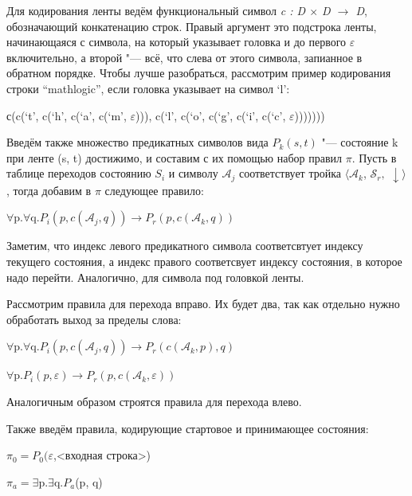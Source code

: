 Для кодирования ленты ведём функциональный символ \textit{c : D $\times$ D $\rightarrow$ D}, обозначающий
конкатенацию строк. Правый аргумент это подстрока ленты, начинающаяся с символа, на который указывает
головка и до первого $\varepsilon$ включительно, а второй "--- всё, что слева от этого символа, запианное
в обратном порядке. Чтобы лучше разобраться, рассмотрим пример кодирования строки ``mathlogic'', если
головка указывает на символ `l':

\begin{center}
        с(c(`t', c(`h', c(`a', c(`m', $\varepsilon$))), 
        c(`l', c(`o', c(`g', c(`i', c(`c', $\varepsilon$)))))))
\end{center}

Введём также множество предикатных символов вида $P_k(s, t)$ "--- состояние k при ленте (s, t) достижимо,
и составим с их помощью набор правил $\pi$. Пусть в таблице переходов состоянию $S_i$ и символу
$\mathcal{A}_j$ соответствует тройка $\langle\mathcal{A}_k$,  $\mathcal{S}_r,$ $\downarrow\rangle$, тогда
добавим в $\pi$ следующее правило:

\begin{center}
    $\forall$p.$\forall$q.$P_i(p, c(\mathcal{A}_j, q))\to P_r(p, c(\mathcal{A}_k, q))$
\end{center}

Заметим, что индекс левого предикатного символа соответсвтует индексу текущего состояния, а индекс
правого соответсвует индексу состояния, в которое надо перейти. Аналогично, для символа под головкой
ленты.

Рассмотрим правила для перехода вправо. Их будет два, так как отдельно нужно обработать
выход за пределы слова:
\begin{center}
    $\forall$p.$\forall$q.$P_i(p, c(\mathcal{A}_j, q))\to P_r(c(\mathcal{A}_k, p), q)$
    
    $\forall$p.$P_i(p, \varepsilon)\to P_r(p, c(\mathcal{A}_k, \varepsilon))$
\end{center}

Аналогичным образом строятся правила для перехода влево. 

Также введём правила, кодирующие стартовое и принимающее состояния:
\begin{center}
    $\pi_0=P_0(\varepsilon$,<входная строка>)
    
    $\pi_a=\exists$p.$\exists$q.$P_a$(p, q)
\end{center}

